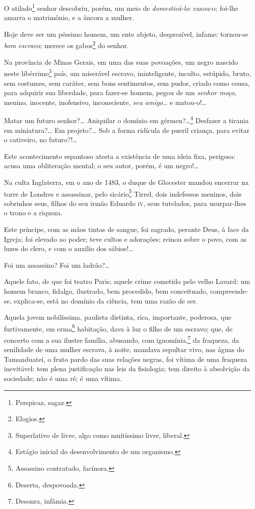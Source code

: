 {  O atilado\footnote{Perspicaz, sagaz.} senhor descobriu, porém, um
    meio de \emph{domesticá-lo}: casou-o; foi-lhe amarra o matrimônio, e a
    âncora a mulher.

  Hoje deve ser um péssimo homem, um ente abjeto, desprezível, infame:
  tornou-se \emph{bom escravo}; merece os gabos\footnote{Elogios.} do
  senhor.

\asterisc

  Na província de Minas Gerais, em uma das suas povoações, um negro
  nascido neste libérrimo\footnote{Superlativo de livre,
  algo como muitíssimo livre, liberal.} país, um miserável escravo,
  ininteligente, inculto, estúpido, bruto, sem costumes, sem caráter,
  sem bons sentimentos, sem pudor, criado como cousa, para adquirir sua
  liberdade, para fazer-se homem, pegou de um \emph{senhor moço},
  menino, inocente, inofensivo, inconsciente, \emph{seu amigo}\ldots{} e
  matou-o!\ldots{}

  Matar um futuro senhor?\ldots{} Aniquilar o domínio em gérmen?\ldots{}\footnote{
    Estágio inicial do desenvolvimento de um organismo.} Desfazer a
  tirania em miniatura?\ldots{} Em projeto?\ldots{} Sob a forma ridícula de pueril
  criança, para evitar o cativeiro, no futuro?!\ldots{}

Este acontecimento espantoso atesta a existência de uma ideia fixa,
perigosa: acusa uma obliteração mental; o seu autor, porém, é um
negro!\ldots{}

\asterisc

Na culta Inglaterra, em o ano de 1483, o duque de Glocester mandou
encerrar na torre de Londres e assassinar, pelo sicário\footnote{
  Assassino contratado, facínora.} Tirrel, dois indefessos meninos, dois
sobrinhos seus, filhos do seu irmão Eduardo \textsc{iv}, seus tutelados, para
usurpar-lhes o trono e a riqueza.

Este príncipe, com as mãos tintas de sangue, foi sagrado, perante Deus,
à face da Igreja; foi elevado ao poder; teve cultos e adorações; reinou
sobre o povo, com as luzes do clero, e com o auxílio dos sábios!\ldots{}

Foi um assassino? Foi um ladrão?\ldots{}

\asterisc

Aquele fato, de que foi teatro Paris; aquele crime cometido pelo velho
Lavard: um homem branco, fidalgo, ilustrado, bem procedido, bem
conceituado, compreende-se, explica-se, está no domínio da ciência, tem
uma razão de ser.

Aquela jovem nobilíssima, paulista distinta, rica, importante, poderosa,
que furtivamente, em erma\footnote{Deserta, despovoada.} habitação,
dava à luz o filho de um escravo; que, de concerto com a sua ilustre
família, abusando, com ignomínia,\footnote{Desonra, infâmia.} da
fraqueza, da senilidade de uma mulher escrava, à noite, mandava sepultar
vivo, nas águas do Tamanduateí, o fruto pardo das suas relações negras,
foi vítima de uma fraqueza inevitável: tem plena justificação nas leis
da fisiologia; tem direito à absolvição da sociedade; não é uma ré; é
uma vítima.

}

